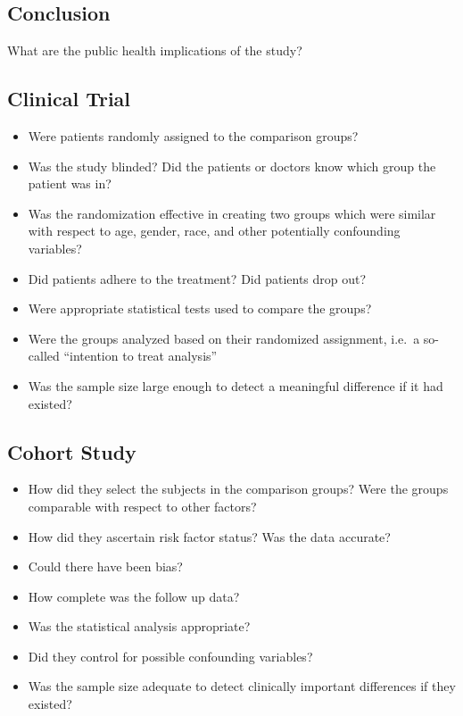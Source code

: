 \documentclass[]{book}
\providecommand{\tightlist}{%
  \setlength{\itemsep}{0pt}\setlength{\parskip}{0pt}}
\begin{document}
\hypertarget{conclusion}{%
\subsection{Conclusion}\label{conclusion}}

What are the public health implications of the study?

\hypertarget{clinical-trial}{%
\subsection{Clinical Trial}\label{clinical-trial}}

\begin{itemize}
\tightlist
\item
  Were patients randomly assigned to the comparison groups?
\item
  Was the study blinded? Did the patients or doctors know which group the patient was in?
\item
  Was the randomization effective in creating two groups which were similar with respect to age, gender, race, and other potentially confounding variables?
\item
  Did patients adhere to the treatment? Did patients drop out?
\item
  Were appropriate statistical tests used to compare the groups?
\item
  Were the groups analyzed based on their randomized assignment, i.e.~a so-called ``intention to treat analysis''
\item
  Was the sample size large enough to detect a meaningful difference if it had existed?
\end{itemize}

\hypertarget{cohort-study}{%
\subsection{Cohort Study}\label{cohort-study}}

\begin{itemize}
\tightlist
\item
  How did they select the subjects in the comparison groups? Were the groups comparable with respect to other factors?
\item
  How did they ascertain risk factor status? Was the data accurate?
\item
  Could there have been bias?
\item
  How complete was the follow up data?
\item
  Was the statistical analysis appropriate?
\item
  Did they control for possible confounding variables?
\item
  Was the sample size adequate to detect clinically important differences if they existed?
\end{itemize}
\end{document}
